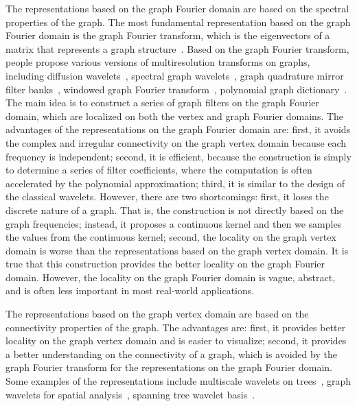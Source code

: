 \documentclass[journal,twocolumn,10pt]{IEEEtran}
\theoremstyle{definition}
\begin{document}
The representations based on the graph Fourier domain are based on the spectral properties of the graph. The most fundamental representation based on the graph Fourier domain is the graph Fourier transform, which is the eigenvectors of a matrix that represents a graph structure~\cite{ShumanNFOV:13, SandryhailaM:13}. Based on the graph Fourier transform, people propose various versions of multiresolution transforms on graphs, including diffusion wavelets~\cite{CoifmanM:06},  spectral graph wavelets~\cite{HammondVG:11}, 
graph quadrature mirror filter banks~\cite{NarangO:12}, windowed graph Fourier transform~\cite{ShumanRV:15}, polynomial graph dictionary~\cite{ThanouSF:14}. The main idea is to construct a series of graph filters on the graph Fourier domain, which are localized on both the vertex and graph Fourier domains. The advantages of the representations on the graph Fourier domain are: first, it avoids the complex and irregular connectivity on the graph vertex domain because each frequency is independent; second, it is efficient, because the construction is simply to determine a series of filter coefficients, where the computation is often accelerated by the polynomial approximation; third, it is similar to the design of the classical wavelets. However, there are two shortcomings: first, it loses the discrete nature of a graph. That is, the construction is not directly based on the graph frequencies; instead, it proposes a continuous kernel and then we samples the values from the continuous kernel;  second, the locality on the graph vertex domain is worse than the representations based on the graph vertex domain. It is true that this construction provides the better locality on the graph Fourier domain. However, the locality on the graph Fourier domain is vague, abstract, and is often less important in most real-world applications.

 
The representations based on the graph vertex domain are based on the connectivity properties of the graph. The advantages are: first, it provides better locality on the graph vertex domain and is easier to visualize; second, it provides a better understanding on the connectivity of a graph, which is avoided by the graph Fourier transform for the representations on the graph Fourier domain. Some examples of the representations include multiscale wavelets on trees~\cite{GavishNC:10}, graph wavelets for spatial analysis~\cite{CrovellaK:03}, spanning tree wavelet basis~\cite{SharpnackKS:13}.
\end{document}
